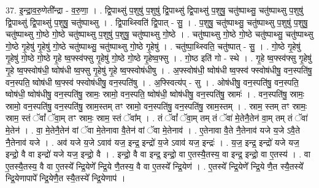 \documentclass[17pt]{extarticle}
\begin{document}
37. इ॒न्द्रा॒व॒रु॒णेती᳚न्द्रा - व॒रु॒णा॒ । . द्वि॒पाथ्सु॑ प॒शुषु॑ प॒शुषु॑ द्वि॒पाथ्सु॑ द्वि॒पाथ्सु॑ प॒शुषु॒ चतु॑ष्पाथ्सु॒ चतु॑ष्पाथ्सु प॒शुषु॑ द्वि॒पाथ्सु॑ द्वि॒पाथ्सु॑ प॒शुषु॒ चतु॑ष्पाथ्सु । . द्वि॒पाथ्स्विति॑ द्वि॒पात् - सु॒ । . प॒शुषु॒ चतु॑ष्पाथ्सु॒ चतु॑ष्पाथ्सु प॒शुषु॑ प॒शुषु॒ चतु॑ष्पाथ्सु गो॒ष्ठे गो॒ष्ठे चतु॑ष्पाथ्सु प॒शुषु॑ प॒शुषु॒ चतु॑ष्पाथ्सु गो॒ष्ठे । . चतु॑ष्पाथ्सु गो॒ष्ठे गो॒ष्ठे चतु॑ष्पाथ्सु॒ चतु॑ष्पाथ्सु गो॒ष्ठे गृ॒हेषु॑ गृ॒हेषु॑ गो॒ष्ठे चतु॑ष्पाथ्सु॒ चतु॑ष्पाथ्सु गो॒ष्ठे गृ॒हेषु॑ । . चतु॑ष्पा॒थ्स्विति॒ चतु॑ष्पात् - सु॒ । . गो॒ष्ठे गृ॒हेषु॑ गृ॒हेषु॑ गो॒ष्ठे गो॒ष्ठे गृ॒हे ष्व॒फ्स्व॑फ्सु गृ॒हेषु॑ गो॒ष्ठे गो॒ष्ठे गृ॒हेष्व॒फ्सु । . गो॒ष्ठ इति॑ गो - स्थे । . गृ॒हे ष्व॒फ्स्व॑फ्सु गृ॒हेषु॑ गृ॒हे ष्व॒फ्स्वोष॑धी॒ ष्वोष॑धी ष्व॒फ्सु गृ॒हेषु॑ गृ॒हे ष्व॒फ्स्वोष॑धीषु । . अ॒फ्स्वोष॑धी॒ ष्वोष॑धी ष्व॒फ्स्व॑ फ्स्वोष॑धीषु॒ वन॒स्पति॑षु॒ वन॒स्पति॒ ष्वोष॑धी ष्व॒फ्स्व॑ फ्स्वोष॑धीषु॒ वन॒स्पति॑षु । . अ॒फ्स्वित्य॑प् - सु । . ओष॑धीषु॒ वन॒स्पति॑षु॒ वन॒स्पति॒ ष्वोष॑धी॒ ष्वोष॑धीषु॒ वन॒स्पति॑षु॒ स्रामः॒ स्रामो॒ वन॒स्पति॒ ष्वोष॑धी॒ ष्वोष॑धीषु॒ वन॒स्पति॑षु॒ स्रामः॑ । . वन॒स्पति॑षु॒ स्रामः॒ स्रामो॒ वन॒स्पति॑षु॒ वन॒स्पति॑षु॒ स्राम॒स्तम् तꣳ स्रामो॒ वन॒स्पति॑षु॒ वन॒स्पति॑षु॒ स्राम॒स्तम् । . स्राम॒ स्तम् तꣳ स्रामः॒ स्राम॒ स्तं ॅवां᳚ ॅवा॒म् तꣳ स्रामः॒ स्राम॒ स्तं ॅवा᳚म् । . तं ॅवां᳚ ॅवा॒म् तम् तं ॅवा॑ मे॒तेनै॒तेन॑ वा॒म् तम् तं ॅवा॑ मे॒तेन॑ । . वा॒ मे॒तेनै॒तेन॑ वां ॅवा मे॒तेनावा वै॒तेन॑ वां ॅवा मे॒तेनाव॑ । . ए॒तेनावा वै॒ते नै॒तेनाव॑ यजे य॒जे ऽवै॒ते नै॒तेनाव॑ यजे । . अव॑ यजे य॒जे ऽवाव॑ यज॒ इन्द्र॒ इन्द्रो॑ य॒जे ऽवाव॑ यज॒ इन्द्रः॑ । . य॒ज॒ इन्द्र॒ इन्द्रो॑ यजे यज॒ इन्द्रो॒ वै वा इन्द्रो॑ यजे यज॒ इन्द्रो॒ वै । . इन्द्रो॒ वै वा इन्द्र॒ इन्द्रो॒ वा ए॒तस्यै॒तस्य॒ वा इन्द्र॒ इन्द्रो॒ वा ए॒तस्य॑ । . वा ए॒तस्यै॒तस्य॒ वै वा ए॒तस्ये᳚ न्द्रि॒येणे᳚ न्द्रि॒ये णै॒तस्य॒ वै वा ए॒तस्ये᳚ न्द्रि॒येण॑ । . ए॒तस्ये᳚ न्द्रि॒येणे᳚ न्द्रि॒ये णै॒त स्यै॒तस्ये᳚ न्द्रि॒येणापापे᳚ न्द्रि॒येणै॒त स्यै॒तस्ये᳚ न्द्रि॒येणाप॑ । \newline
\pagebreak
{}
\end{document}
